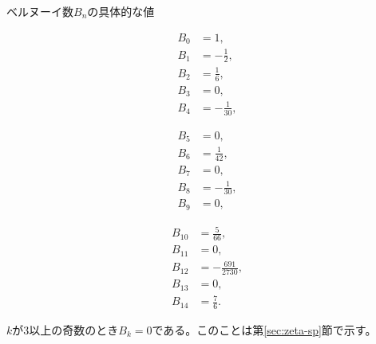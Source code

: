 \documentclass[11pt,b5paper,papersize,dvipdfmx]{jsbook}
\begin{document}
\begin{thm}{ベルヌーイ数$B_n$の具体的な値}\par
  \begin{minipage}{0.3\hsize}
    \begin{align*}
      B_0 &= 1,\\
      B_1 &= -\frac12,\\
      B_2 &= \frac16,\\
      B_3 &= 0,\\
      B_4 &= -\frac1{30},
    \end{align*}
  \end{minipage}
  \begin{minipage}{0.3\hsize}
    \begin{align*}
      B_5 &= 0,\\
      B_6 &= \frac1{42},\\
      B_7 &= 0,\\
      B_8 &= -\frac1{30},\\
      B_9 &= 0,
    \end{align*}
  \end{minipage}
  \begin{minipage}{0.3\hsize}
    \begin{align*}
      B_{10} &= \frac5{66},\\
      B_{11} &= 0,\\
      B_{12} &= -\frac{691}{2730},\\
      B_{13} &= 0,\\
      B_{14} &= \frac76.
    \end{align*}
  \end{minipage}
\end{thm}
%
\begin{remark}
  $k$が3以上の奇数のとき$B_k = 0$である。このことは第\ref{sec:zeta-sp}節で示す。
\end{remark}
\end{document}

